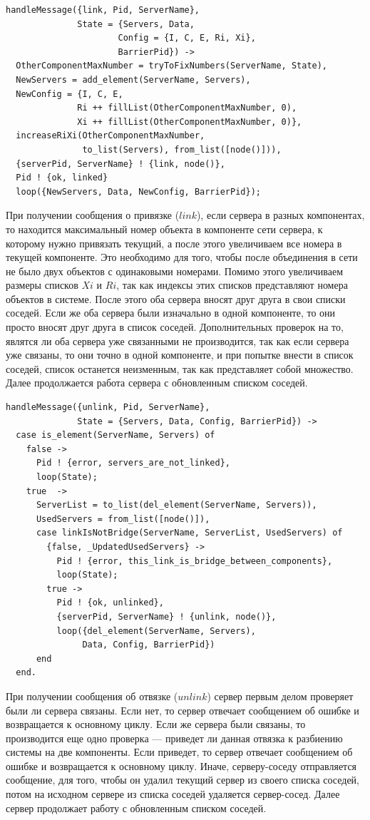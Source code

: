 			\begin{lstlisting}
handleMessage({link, Pid, ServerName}, 
              State = {Servers, Data, 
                      Config = {I, C, E, Ri, Xi}, 
                      BarrierPid}) ->
  OtherComponentMaxNumber = tryToFixNumbers(ServerName, State),
  NewServers = add_element(ServerName, Servers),
  NewConfig = {I, C, E, 
              Ri ++ fillList(OtherComponentMaxNumber, 0), 
              Xi ++ fillList(OtherComponentMaxNumber, 0)},
  increaseRiXi(OtherComponentMaxNumber,
               to_list(Servers), from_list([node()])),
  {serverPid, ServerName} ! {link, node()},   
  Pid ! {ok, linked}
  loop({NewServers, Data, NewConfig, BarrierPid});				
			\end{lstlisting}
			При получении сообщения о привязке ($link$), если сервера в разных компонентах, то находится максимальный номер объекта в компоненте сети сервера, к которому нужно привязать текущий, 
			а после этого увеличиваем все номера в текущей компоненте. Это необходимо для того, чтобы после объединения в сети не было двух объектов с одинаковыми номерами. Помимо этого 
			увеличиваем размеры списков $Xi$ и $Ri$, так как индексы этих списков представляют номера объектов в системе. После этого оба сервера вносят друг друга в свои списки соседей. 
			Если же оба сервера были изначально в одной компоненте, то они просто вносят друг друга в список соседей. Дополнительных проверок на то, являтся ли оба сервера уже связанными 
			не производится, так как если сервера уже связаны, то они точно в одной компоненте, и при попытке внести в список соседей, список останется неизменным, так как представляет собой 
			множество. Далее продолжается работа сервера с обновленным списком соседей.

			\begin{lstlisting}
handleMessage({unlink, Pid, ServerName}, 
              State = {Servers, Data, Config, BarrierPid}) ->
  case is_element(ServerName, Servers) of
    false -> 
      Pid ! {error, servers_are_not_linked},
      loop(State);
    true  ->
      ServerList = to_list(del_element(ServerName, Servers)),
      UsedServers = from_list([node()]),
      case linkIsNotBridge(ServerName, ServerList, UsedServers) of
        {false, _UpdatedUsedServers} -> 
          Pid ! {error, this_link_is_bridge_between_components},
          loop(State);
        true ->
          Pid ! {ok, unlinked},
          {serverPid, ServerName} ! {unlink, node()},
          loop({del_element(ServerName, Servers), 
               Data, Config, BarrierPid})
      end
  end.				
			\end{lstlisting}
			При получении сообщения об отвязке ($unlink$) сервер первым делом проверяет были ли сервера связаны. Если нет, то сервер отвечает сообщением об ошибке и возвращается к 
			основному циклу. Если же сервера были связаны, то производится еще одно проверка --- приведет ли данная отвязка к разбиению системы на две компоненты. Если приведет, то
			сервер отвечает сообщением об ошибке и возвращается к основному циклу. Иначе, серверу-соседу отправляется сообщение, для того, чтобы он удалил текущий сервер из своего списка соседей,
			потом на исходном сервере из списка соседей удаляется сервер-сосед. Далее сервер продолжает работу с обновленным списком соседей.

